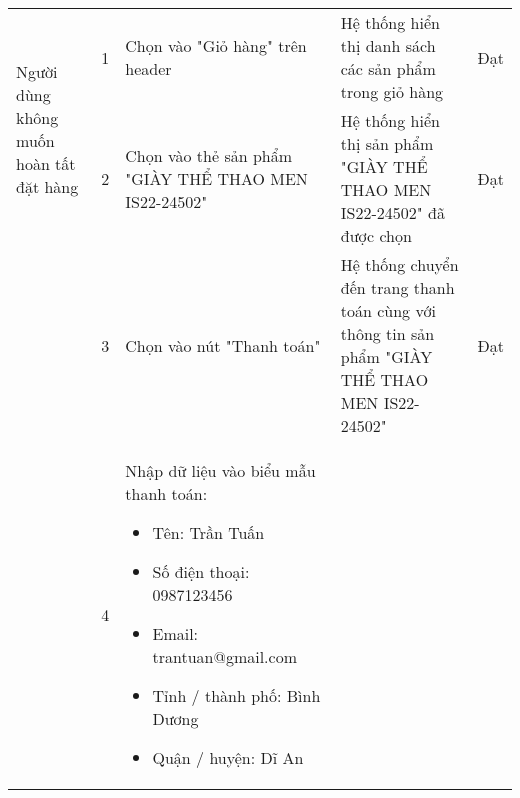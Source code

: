 {\begin{longtable}{| p{2.5cm}| p{1cm}| p{5.5cm}| p{4.5cm} | p{1.5cm} |}
        \hline
        \multirow[t]{2}{2.5cm}{Người dùng không muốn hoàn tất đặt hàng}                                 &
        1                                                                                               &
        Chọn vào "Giỏ hàng" trên header                                                                 &
        Hệ thống hiển thị danh sách các sản phẩm trong giỏ hàng                                         &
        Đạt                                                                                                                                                                                            \\
        \cline{2-5}
                                                                                                        & 2                  &
        Chọn vào thẻ sản phẩm "GIÀY THỂ THAO MEN IS22-24502"                                            &
        Hệ thống hiển thị sản phẩm "GIÀY THỂ THAO MEN IS22-24502" đã được chọn                          &
        Đạt                                                                                                                                                                                            \\
        \cline{2-5}
                                                                                                        & 3                  &
        Chọn vào nút "Thanh toán"                                                                       &
        Hệ thống chuyển đến trang thanh toán cùng với thông tin sản phẩm "GIÀY THỂ THAO MEN IS22-24502" &
        Đạt                                                                                                                                                                                            \\
        \cline{2-5}
                                                                                                        & 4                  &
        Nhập dữ liệu vào biểu mẫu thanh toán:
        \begin{itemize}
            \item Tên: Trần Tuấn
            \item Số điện thoại: 0987123456
            \item Email: trantuan@gmail.com
            \item Tỉnh / thành phố: Bình Dương
            \item Quận / huyện: Dĩ An

\end{itemize}
\end{longtable}}
